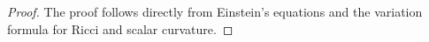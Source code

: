 \documentclass{amsart}
\newcommand{\tr}{\mbox{tr}}
\begin{document}
\begin{proof}
 The proof follows directly from Einstein's equations and the variation formula for Ricci and scalar curvature. 
 
\end{proof}
\end{document}

